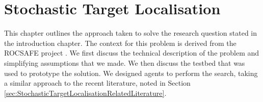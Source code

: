 
\chapter{Stochastic Target Localisation}\label{chap:targetLocalisation}
This chapter outlines the approach taken to solve the research question stated in the introduction chapter. The context for this problem is derived from the ROCSAFE project \cite{Bagherzadeh2017ROCSAFE:Incidents}. We first discuss the technical description of the problem and simplifying assumptions that we made. We then discuss the testbed that was used to prototype the solution. We designed agents to perform the search, taking a similar approach to the recent literature, noted in Section \ref{sec:StochasticTargetLocalisationRelatedLiterature}.











\label{sec:SimulationResults}

